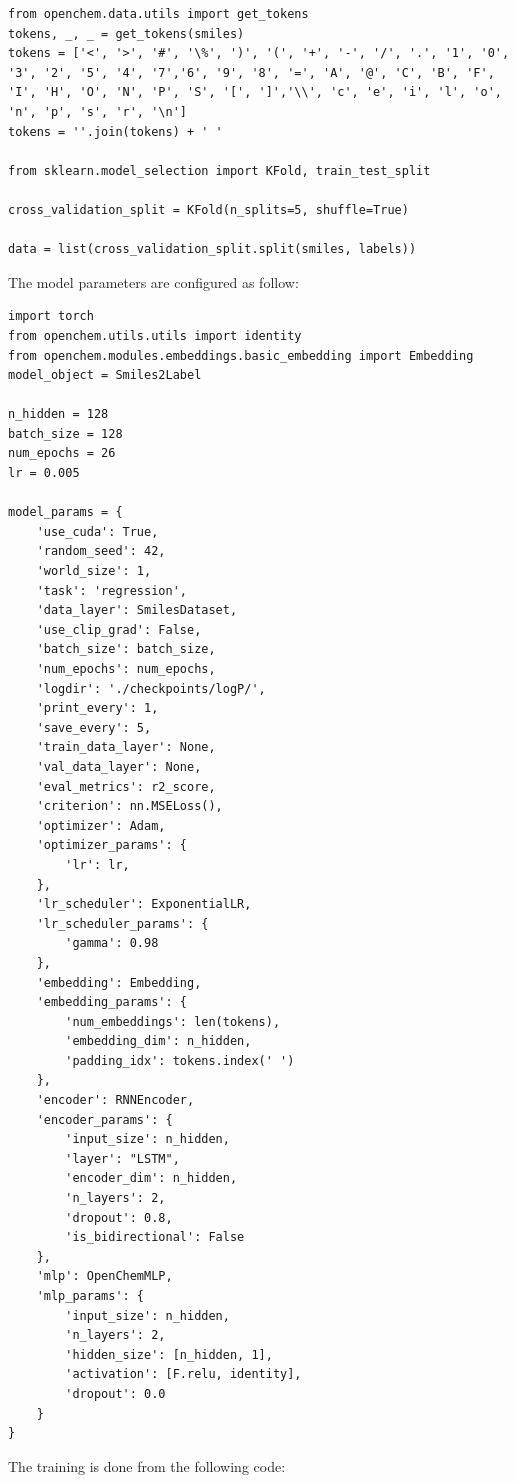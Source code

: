 \documentclass[a4paper]{article}
\begin{document}
\begin{lstlisting}
from openchem.data.utils import get_tokens
tokens, _, _ = get_tokens(smiles)
tokens = ['<', '>', '#', '\%', ')', '(', '+', '-', '/', '.', '1', '0', '3', '2', '5', '4', '7','6', '9', '8', '=', 'A', '@', 'C', 'B', 'F', 'I', 'H', 'O', 'N', 'P', 'S', '[', ']','\\', 'c', 'e', 'i', 'l', 'o', 'n', 'p', 's', 'r', '\n']
tokens = ''.join(tokens) + ' '

from sklearn.model_selection import KFold, train_test_split

cross_validation_split = KFold(n_splits=5, shuffle=True)

data = list(cross_validation_split.split(smiles, labels))
\end{lstlisting}

The model parameters are configured as follow:

\begin{lstlisting}
import torch
from openchem.utils.utils import identity
from openchem.modules.embeddings.basic_embedding import Embedding
model_object = Smiles2Label

n_hidden = 128
batch_size = 128
num_epochs = 26
lr = 0.005

model_params = {
    'use_cuda': True,
    'random_seed': 42,
    'world_size': 1,
    'task': 'regression',
    'data_layer': SmilesDataset,
    'use_clip_grad': False,
    'batch_size': batch_size,
    'num_epochs': num_epochs,
    'logdir': './checkpoints/logP/',
    'print_every': 1,
    'save_every': 5,
    'train_data_layer': None,
    'val_data_layer': None,
    'eval_metrics': r2_score,
    'criterion': nn.MSELoss(),
    'optimizer': Adam,
    'optimizer_params': {
        'lr': lr,
    },
    'lr_scheduler': ExponentialLR,
    'lr_scheduler_params': {
        'gamma': 0.98
    },
    'embedding': Embedding,
    'embedding_params': {
        'num_embeddings': len(tokens),
        'embedding_dim': n_hidden,
        'padding_idx': tokens.index(' ')
    },
    'encoder': RNNEncoder,
    'encoder_params': {
        'input_size': n_hidden,
        'layer': "LSTM",
        'encoder_dim': n_hidden,
        'n_layers': 2,
        'dropout': 0.8,
        'is_bidirectional': False
    },
    'mlp': OpenChemMLP,
    'mlp_params': {
        'input_size': n_hidden,
        'n_layers': 2,
        'hidden_size': [n_hidden, 1],
        'activation': [F.relu, identity],
        'dropout': 0.0
    }
}
\end{lstlisting}

The training is done from the following code:
\end{document}
